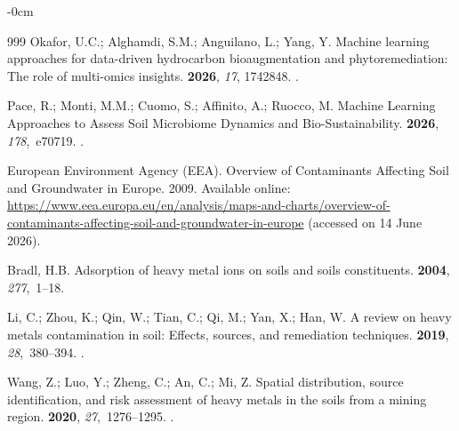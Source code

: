 \documentclass[environremediat,article,accept,pdftex,oneauthor]{Definitions/mdpi}
\begin{document}
\begin{adjustwidth}{-\extralength}{0cm}
\begin{thebibliography}{999}
Okafor, U.C.; Alghamdi, S.M.; Anguilano, L.; Yang, Y.
\newblock Machine learning approaches for data-driven hydrocarbon
  bioaugmentation and phytoremediation: The role of multi-omics insights.
 {\bf 2026}, {\em 17}, 1742848.
.

Pace, R.; Monti, M.M.; Cuomo, S.; Affinito, A.; Ruocco, M.
\newblock Machine Learning Approaches to Assess Soil Microbiome Dynamics and
  Bio-Sustainability.
 {\bf 2026}, {\em 178},~e70719.
.

{European Environment Agency (EEA)}.
\newblock Overview of Contaminants Affecting Soil and Groundwater in Europe.
  2009. %
 Available %
 online: \url{https://www.eea.europa.eu/en/analysis/maps-and-charts/overview-of-contaminants-affecting-soil-and-groundwater-in-europe} (accessed on 14 June 2026). %

Bradl, H.B.
\newblock Adsorption of heavy metal ions on soils and soils constituents.
 {\bf 2004}, {\em
  277},~1--18.

Li, C.; Zhou, K.; Qin, W.; Tian, C.; Qi, M.; Yan, X.; Han, W.
\newblock A review on heavy metals contamination in soil: Effects, sources, and
  remediation techniques.
 {\bf
  2019}, {\em 28},~380--394.
.

Wang, Z.; Luo, Y.; Zheng, C.; An, C.; Mi, Z.
\newblock Spatial distribution, source identification, and risk assessment of
  heavy metals in the soils from a mining region.
  {\bf 2020}, {\em 27},~1276--1295.
.


\end{thebibliography}
\end{adjustwidth}
\end{document}
